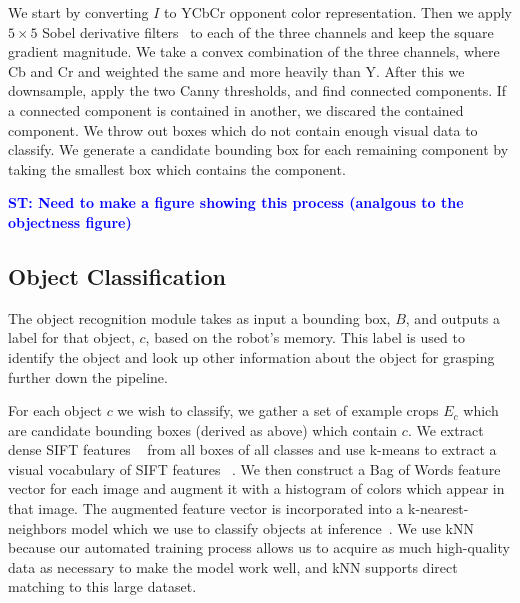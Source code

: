 \documentclass{article}
\newcommand{\stnote}[1]{\textcolor{blue}{\textbf{ST: #1}}}
\newcommand{\jgonote}[1]{\textcolor{green}{\textbf{JGO: #1}}}
\begin{document}
We start by converting $I$ to YCbCr opponent color representation.
Then we apply $5 \times 5$ Sobel derivative filters~\citep{sobel95} to
each of the three channels and keep the square gradient magnitude. We
take a convex combination of the three channels, where Cb and Cr and
weighted the same and more heavily than Y.  After this we downsample,
apply the two Canny thresholds, and find connected components.  If a
connected component is contained in another, we discared the contained
component.  We throw out boxes which do not contain enough visual data
to classify.  We generate a candidate bounding box for each remaining
component by taking the smallest box which contains the component.

\stnote{Need to make a figure showing this process (analgous to the
  objectness figure)}

\subsection{Object Classification}
\label{sec:recognition}

The object recognition module takes as input a bounding box, $B$, and
outputs a label for that object, $c$, based on the robot's memory.
This label is used to identify the object and look up other
information about the object for grasping further down the pipeline.

For each object $c$ we wish to classify, we gather a set of example
crops $E_c$ which are candidate bounding boxes (derived as above)
which contain $c$. We extract dense SIFT features ~\citep{lowe99} from
all boxes of all classes and use k-means to extract a visual
vocabulary of SIFT features ~\citep{szeliski10}. We then construct a
Bag of Words feature vector for each image and augment it with a histogram of
colors which appear in that image.  The augmented feature vector is
incorporated into a k-nearest-neighbors model which we use to classify
objects at inference~\citep{szeliski10}. We use kNN because our
automated training process allows us to acquire as much high-quality
data as necessary to make the model work well, and kNN supports direct
matching to this large dataset.  

\end{document}
